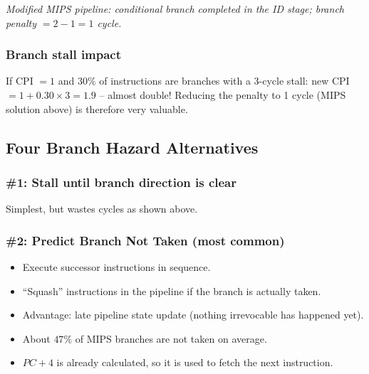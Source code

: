 \begin{center}
\end{center}
{\small \emph{Modified MIPS pipeline: conditional branch completed in the ID
stage; branch penalty $=2-1=1$ cycle.}}

\subsubsection{Branch stall impact}

\begin{eg}
If CPI $=1$ and $30\%$ of instructions are branches with a 3-cycle stall:
new CPI $= 1 + 0.30\times3 = 1.9$ -- almost double! Reducing the penalty to
1 cycle (MIPS solution above) is therefore very valuable.
\end{eg}

\subsection{Four Branch Hazard Alternatives}

\subsubsection{\#1: Stall until branch direction is clear}
Simplest, but wastes cycles as shown above.

\subsubsection{\#2: Predict Branch Not Taken (most common)}
\begin{itemize}
  \item Execute successor instructions in sequence.
  \item ``Squash'' instructions in the pipeline if the branch is actually
  taken.
  \item Advantage: late pipeline state update (nothing irrevocable has
  happened yet).
  \item About $47\%$ of MIPS branches are not taken on average.
  \item $PC+4$ is already calculated, so it is used to fetch the next
  instruction.
\end{itemize}

